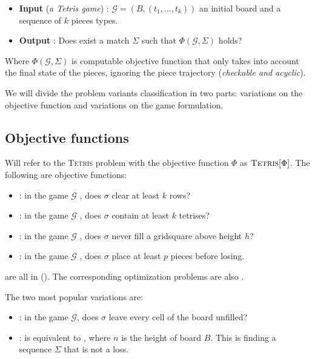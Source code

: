 \begin{itemize}
  \item \textbf{Input} (\textit{a Tetris game}) : $\mathcal{G} = (B,(t_1,\dots,t_k))$ an initial board and a sequence of $k$ pieces types.
  
  \item \textbf{Output} : Does exist a match $\Sigma$ such that $\Phi ( \mathcal{G}, \Sigma )$ holds? 
\end{itemize}

Where $\Phi(\mathcal{G},\Sigma)$ is computable objective function that only takes into account the final state of the pieces, ignoring the piece trajectory (\emph{checkable and acyclic}). 


We will divide the problem variants classification in two parts: variations on the objective function and variations on the game formulation.

\subsection{Objective functions} 

Will refer to the \textsc{Tetris} problem with the objective function $\Phi$ as $\textsc{Tetris} [ \Phi ]$. The following are objective functions:

\begin{itemize}
  \item {}: in the game $\mathcal{G}$ , does $\sigma$ clear at least $k$ rows?
  \item {}: in the game $\mathcal{G}$ , does $\sigma$ contain at least $k$ tetrises?
  \item {}: in the game $\mathcal{G}$ , does $\sigma$ never fill a gridsquare above height $h$?
  \item {}: in the game $\mathcal{G}$ , does $\sigma$ place at least $p$ pieces before losing.
\end{itemize} are all in \npc (\cite{TIH}). The corresponding optimization problems are also \npc.

The two most popular variations are:

\begin{itemize} 
  \item \label{var:clearing} : in the game $\mathcal{G}$, does $\sigma$ leave every cell of the board unfilled?
  \item \label{var:survival}: is equivalent to , where $n$ is the height of board $B$. This is finding a sequence $\Sigma$ that is not a loss.
\end{itemize}

